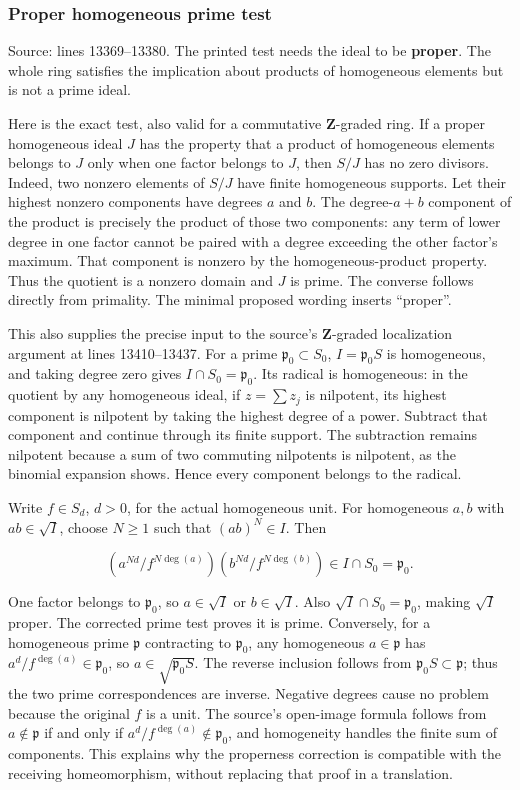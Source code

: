 \subsubsection{Proper homogeneous prime test}\label{proper-homogeneous-prime-test}

Source: lines 13369--13380. The printed test needs the ideal to be \textbf{proper}. The whole ring satisfies the implication about products of homogeneous elements but is not a prime ideal.

Here is the exact test, also valid for a commutative \(\mathbf Z\)-graded ring. If a proper homogeneous ideal \(J\) has the property that a product of homogeneous elements belongs to \(J\) only when one factor belongs to \(J\), then \(S/J\) has no zero divisors. Indeed, two nonzero elements of \(S/J\) have finite homogeneous supports. Let their highest nonzero components have degrees \(a\) and \(b\). The degree-\(a+b\) component of the product is precisely the product of those two components: any term of lower degree in one factor cannot be paired with a degree exceeding the other factor's maximum. That component is nonzero by the homogeneous-product property. Thus the quotient is a nonzero domain and \(J\) is prime. The converse follows directly from primality. The minimal proposed wording inserts ``proper''.

This also supplies the precise input to the source's \(\mathbf Z\)-graded localization argument at lines 13410--13437. For a prime \(\mathfrak p_0\subset S_0\), \(I=\mathfrak p_0S\) is homogeneous, and taking degree zero gives \(I\cap S_0=\mathfrak p_0\). Its radical is homogeneous: in the quotient by any homogeneous ideal, if \(z=\sum z_j\) is nilpotent, its highest component is nilpotent by taking the highest degree of a power. Subtract that component and continue through its finite support. The subtraction remains nilpotent because a sum of two commuting nilpotents is nilpotent, as the binomial expansion shows. Hence every component belongs to the radical.

Write \(f\in S_d\), \(d>0\), for the actual homogeneous unit. For homogeneous \(a,b\) with \(ab\in\sqrt I\), choose \(N\geq1\) such that \((ab)^N\in I\). Then

\[
\left(a^{Nd}/f^{N\deg(a)}\right)
\left(b^{Nd}/f^{N\deg(b)}\right)\in I\cap S_0=\mathfrak p_0.
\]

One factor belongs to \(\mathfrak p_0\), so \(a\in\sqrt I\) or \(b\in\sqrt I\). Also \(\sqrt I\cap S_0=\mathfrak p_0\), making \(\sqrt I\) proper. The corrected prime test proves it is prime. Conversely, for a homogeneous prime \(\mathfrak p\) contracting to \(\mathfrak p_0\), any homogeneous \(a\in\mathfrak p\) has \(a^d/f^{\deg(a)}\in\mathfrak p_0\), so \(a\in\sqrt{\mathfrak p_0S}\). The reverse inclusion follows from \(\mathfrak p_0S\subset\mathfrak p\); thus the two prime correspondences are inverse. Negative degrees cause no problem because the original \(f\) is a unit. The source's open-image formula follows from \(a\notin\mathfrak p\) if and only if \(a^d/f^{\deg(a)}\notin\mathfrak p_0\), and homogeneity handles the finite sum of components. This explains why the properness correction is compatible with the receiving homeomorphism, without replacing that proof in a translation.

